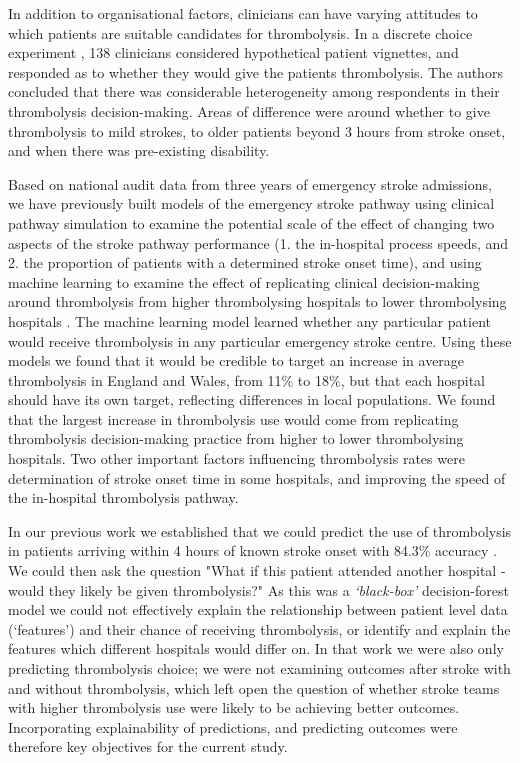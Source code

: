 In addition to organisational factors, clinicians can have varying attitudes to which patients are suitable candidates for thrombolysis. In a discrete choice experiment \cite{de_brun_factors_2018}, 138 clinicians considered hypothetical patient vignettes, and responded as to whether they would give the patients thrombolysis. The authors concluded that there was considerable heterogeneity among respondents in their thrombolysis decision-making. Areas of difference were around whether to give thrombolysis to mild strokes, to older patients beyond 3 hours from stroke onset, and when there was pre-existing disability.

Based on national audit data from three years of emergency stroke admissions, we have previously built models of the emergency stroke pathway using clinical pathway simulation to examine the potential scale of the effect of changing two aspects of the stroke pathway performance (1. the in-hospital process speeds, and 2. the proportion of patients with a determined stroke onset time), and using machine learning to examine the effect of replicating clinical decision-making around thrombolysis from higher thrombolysing hospitals to lower thrombolysing hospitals \cite{allen_using_2022, allen_use_2022}. The machine learning model learned whether any particular patient would receive thrombolysis in any particular emergency stroke centre. Using these models we found that it would be credible to target an increase in average thrombolysis in England and Wales, from 11\% to 18\%, but that each hospital should have its own target, reflecting differences in local populations. We found that the largest increase in thrombolysis use would come from replicating thrombolysis decision-making practice from higher to lower thrombolysing hospitals. Two other important factors influencing thrombolysis rates were determination of stroke onset time in some hospitals, and improving the speed of the in-hospital thrombolysis pathway.


In our previous work we established that we could predict the use of thrombolysis in patients arriving within 4 hours of known stroke onset with 84.3\% accuracy \cite{allen_use_2022}. We could then ask the question "What if this patient attended another hospital - would they likely be given thrombolysis?" As this was a \emph{`black-box'} decision-forest model we could not effectively explain the relationship between patient level data (`features') and their chance of receiving thrombolysis, or identify and explain the features which different hospitals would differ on. In that work we were also only predicting thrombolysis choice; we were not examining outcomes after stroke with and without thrombolysis, which left open the question of whether stroke teams with higher thrombolysis use were likely to be achieving better outcomes. Incorporating explainability of predictions, and predicting outcomes were therefore key objectives for the current study.

